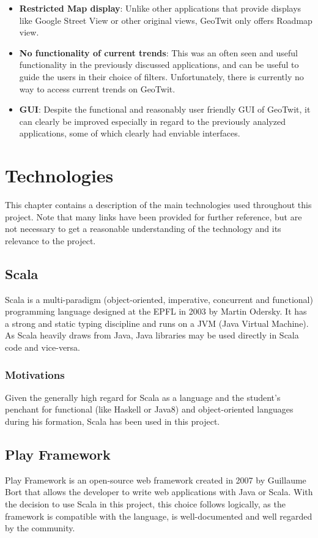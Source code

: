 \documentclass[a4paper,11pt]{report}
\begin{document}
\begin{itemize}
	\item \textbf{Restricted Map display}: Unlike other applications that provide displays like Google Street View or other original views, GeoTwit only offers Roadmap view.
	\item \textbf{No functionality of current trends}: This was an often seen and useful functionality in the previously discussed applications, and can be useful to guide the users in their choice of filters. Unfortunately, there is currently no way to access current trends on GeoTwit.
	\item \textbf{GUI}: Despite the functional and reasonably user friendly GUI of GeoTwit, it can clearly be improved especially in regard to the previously analyzed applications, some of which clearly had enviable interfaces.
\end{itemize}
\color{black}
\renewcommand{\labelitemi}{\textbullet}
\bigskip
\newpage

\section{Technologies}
This chapter contains a description of the main technologies used throughout this project. Note that many links have been provided for further reference, but are not necessary to get a reasonable understanding of the technology and its relevance to the project.
\bigskip

\subsection{Scala}
Scala is a multi-paradigm (object-oriented, imperative, concurrent and functional) programming language designed at the EPFL in 2003 by Martin Odersky. It has a strong and static typing discipline and runs on a JVM (Java Virtual Machine). As Scala heavily draws from Java, Java libraries may be used directly in Scala code and vice-versa.

\subsubsection{Motivations}
Given the generally high regard for Scala as a language and the student's penchant for functional (like Haskell or Java8) and object-oriented languages during his formation, Scala has been used in this project.
\bigskip

\subsection{Play Framework}
Play Framework is an open-source web framework created in 2007 by Guillaume Bort that allows the developer to write web applications with Java or Scala. With the decision to use Scala in this project, this choice follows logically, as the framework is compatible with the language, is well-documented and well regarded by the community.\\
\end{document}

